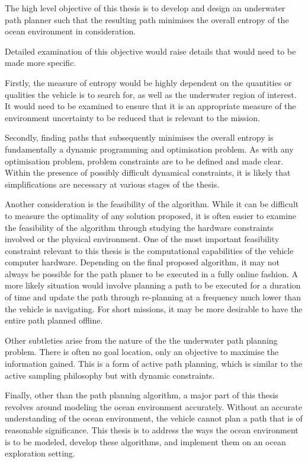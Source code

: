 		The high level objective of this thesis is to develop and design an underwater path planner such that the resulting path minimises the overall entropy of the ocean environment in consideration.
		
		Detailed examination of this objective would raise details that would need to be made more specific.
		
		Firstly, the measure of entropy would be highly dependent on the quantities or qualities the vehicle is to search for, as well as the underwater region of interest. It would need to be examined to ensure that it is an appropriate measure of the environment uncertainty to be reduced that is relevant to the mission.
		
		Secondly, finding paths that subsequently minimises the overall entropy is fundamentally a dynamic programming and optimisation problem. As with any optimisation problem, problem constraints are to be defined and made clear. Within the presence of possibly difficult dynamical constraints, it is likely that simplifications are necessary at various stages of the thesis.
		
		Another consideration is the feasibility of the algorithm. While it can be difficult to measure the optimality of any solution proposed, it is often easier to examine the feasibility of the algorithm through studying the hardware constraints involved or the physical environment. One of the most important feasibility constraint relevant to this thesis is the computational capabilities of the vehicle computer hardware. Depending on the final proposed algorithm, it may not always be possible for the path planer to be executed in a fully online fashion. A more likely situation would involve planning a path to be executed for a duration of time and update the path through re-planning at a frequency much lower than the vehicle is navigating. For short missions, it may be more desirable to have the entire path planned offline.
		
		Other subtleties arise from the nature of the the underwater path planning problem. There is often no goal location, only an objective to maximise the information gained. This is a form of active path planning, which is similar to the active sampling philosophy but with dynamic constraints.
		
		Finally, other than the path planning algorithm, a major part of this thesis revolves around modeling the ocean environment accurately. Without an accurate understanding of the ocean environment, the vehicle cannot plan a path that is of reasonable significance. This thesis is to address the ways the ocean environment is to be modeled, develop these algorithms, and implement them on an ocean exploration setting.
		
